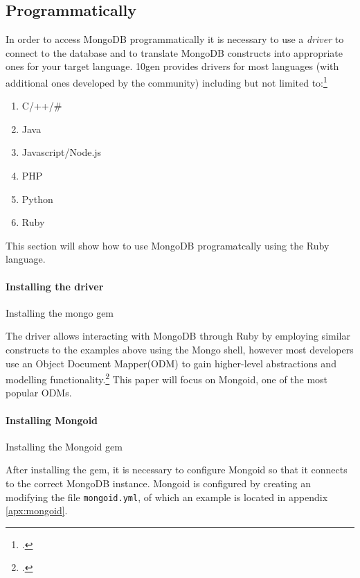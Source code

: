 \FloatBarrier

\subsection{Programmatically}
\label{sec:usage-programmatically}
In order to access MongoDB programmatically it is necessary to use a \textit{driver} to connect to the database and to translate MongoDB constructs into appropriate ones for your target language. 10gen provides drivers for most languages (with additional ones developed by the community) including but not limited to:\footcite[Cf.][]{mongo_drivers}
\begin{enumerate}
\item C/++/\#
\item Java
\item Javascript/Node.js
\item PHP
\item Python
\item Ruby
\end{enumerate}

This section will show how to use MongoDB programatcally using the Ruby language.

\paragraph{Installing the driver}
\begin{code}
	\caption{Installing the mongo gem}
	\label{lst:installMongoGem}
\end{code}

The driver allows interacting with MongoDB through Ruby by employing similar constructs to the examples above using the Mongo shell, however most developers use an Object Document Mapper(ODM) to gain higher-level abstractions and modelling functionality.\footcite[Cf.][]{mongo_ruby_driver} This paper will focus on Mongoid, one of the most popular ODMs.

\paragraph{Installing Mongoid}
\begin{code}
	\caption{Installing the Mongoid gem}
	\label{lst:installMongoid}
\end{code}

After installing the gem, it is necessary to configure Mongoid so that it
connects to the correct MongoDB instance. Mongoid is configured by creating an
modifying the file \texttt{mongoid.yml}, of which an example is located in
appendix \ref{apx:mongoid}.

